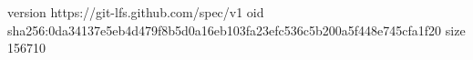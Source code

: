 version https://git-lfs.github.com/spec/v1
oid sha256:0da34137e5eb4d479f8b5d0a16eb103fa23efc536c5b200a5f448e745cfa1f20
size 156710
